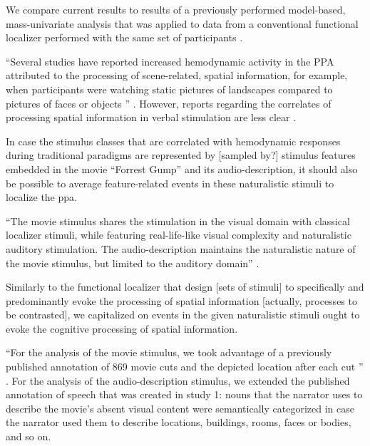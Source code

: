 %
We compare current results to results of a previously performed model-based,
mass-univariate analysis that was applied to data from a conventional functional
localizer performed with the same set of participants
\citep{sengupta2016extension}.

``Several studies have reported increased hemodynamic activity in the PPA
attributed to the processing of scene-related, spatial information, for example,
when participants were watching static pictures of landscapes compared to
pictures of faces or objects \citep{epstein1998ppa,
epstein1999parahippocampal}'' \citep{haeusler2022processing}.
However, reports regarding the correlates of processing spatial information in
verbal stimulation are less clear \citep{aziz2008modulation}.

In case the stimulus classes that are correlated with hemodynamic responses
during traditional paradigms are represented by [sampled by?] stimulus features
embedded in the movie ``Forrest Gump'' and its audio-description, it should also
be possible to average feature-related events in these naturalistic stimuli to
localize the \ac{ppa}.

``The movie stimulus shares the stimulation in the visual domain with classical
localizer stimuli, while featuring real-life-like visual complexity and
naturalistic auditory stimulation. The audio-description maintains the
naturalistic nature of the movie stimulus, but limited to the auditory domain''
\citep{haeusler2022processing}.

Similarly to the functional localizer that design [sets of stimuli] to
specifically and predominantly evoke the processing of spatial information
[actually, processes to be contrasted], we capitalized on events in the given
naturalistic stimuli ought to evoke the cognitive processing of spatial
information.

``For the analysis of the movie stimulus, we took advantage of a previously
published annotation of 869 movie cuts and the depicted location after each cut
\citep{haeusler2016cutanno}'' \citep{haeusler2022processing}.
For the analysis of the audio-description stimulus, we extended the published
annotation of speech \citep{haeusler2021speechanno} that was created in study 1:
%
nouns that the narrator uses to describe the movie's absent visual content were
semantically categorized in case the narrator used them to describe locations,
buildings, rooms, faces or bodies, and so on.

